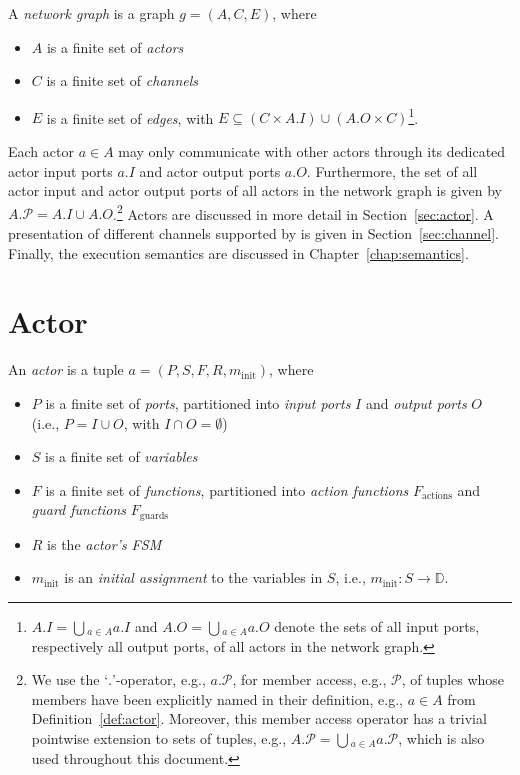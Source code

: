 \begin{definition}\label{def:network-graph}
A \emph{network graph} is a graph $g=(A,C,E)$, where
\begin{itemize}
\item $A$ is a finite set of \emph{actors}
\item $C$ is a finite set of \emph{channels}
\item $E$ is a finite set of \emph{edges}, with $E \subseteq (C \times A.I) \cup (A.O \times C)$\footnote{
 $A.I = \bigcup{}_{a \in A} a.I$ and $A.O = \bigcup{}_{a \in A} a.O$ denote the sets of all input ports, respectively all output ports, of all actors in the network graph.
}.
\end{itemize}
\end{definition}

Each actor $a \in A$ may only communicate with other actors through its dedicated actor input ports $a.I$ and actor output ports $a.O$.
Furthermore, the set of all actor input and actor output ports of all actors in the network graph is given by $A.\mathcal{P} = A.I \cup A.O$.\footnote{We use the `$.$'-operator, e.g., $a.\mathcal{P}$, for member access, e.g., $\mathcal{P}$, of tuples whose members have been explicitly named in their definition, e.g., $a \in A$ from Definition~\ref{def:actor}.
  Moreover, this member access operator has a trivial pointwise extension to sets of tuples, e.g., $A.\mathcal{P} = \bigcup{}_{a \in A} a.\mathcal{P}$, which is also used throughout this document.}
Actors are discussed in more detail in Section~\ref{sec:actor}.
A presentation of different channels supported by \SysteMoC{} is given in Section~\ref{sec:channel}.
Finally, the execution semantics are discussed in Chapter~\ref{chap:semantics}.

%
%
\section{Actor \label{sec:actor}}

\begin{definition}[Actor]\label{def:actor}
An \emph{actor} is a tuple $a=(P,S,F,R,m_\mathrm{init})$, where
\begin{itemize}
\item $P$ is a finite set of \emph{ports}, partitioned into \emph{input ports} $I$ and \emph{output ports} $O$ (i.e., $P=I\cup O$, with $I\cap O=\emptyset$) 
\item $S$ is a finite set of \emph{variables}
\item $F$ is a finite set of \emph{functions}, partitioned into \emph{action functions} $F_\mathrm{actions}$ and \emph{guard functions} $F_\mathrm{guards}$
\item $R$ is the \emph{actor's FSM}
\item $m_\mathrm{init}$ is an \emph{initial assignment} to the variables in $S$, i.e., $m_\mathrm{init} : S \rightarrow \mathbb{D}$.
\end{itemize}
\end{definition}

